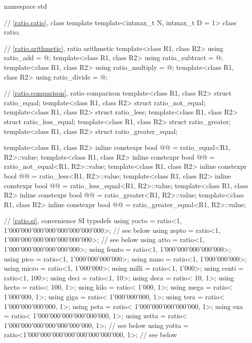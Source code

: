 %
\begin{codeblockdigitsep}
namespace std {
  // \ref{ratio.ratio}, class template 
  template<intmax_t N, intmax_t D = 1> class ratio;

  // \ref{ratio.arithmetic}, ratio arithmetic
  template<class R1, class R2> using ratio_add = @\seebelow@;
  template<class R1, class R2> using ratio_subtract = @\seebelow@;
  template<class R1, class R2> using ratio_multiply = @\seebelow@;
  template<class R1, class R2> using ratio_divide = @\seebelow@;

  // \ref{ratio.comparison}, ratio comparison
  template<class R1, class R2> struct ratio_equal;
  template<class R1, class R2> struct ratio_not_equal;
  template<class R1, class R2> struct ratio_less;
  template<class R1, class R2> struct ratio_less_equal;
  template<class R1, class R2> struct ratio_greater;
  template<class R1, class R2> struct ratio_greater_equal;

  template<class R1, class R2>
    inline constexpr bool @@ = ratio_equal<R1, R2>::value;
  template<class R1, class R2>
    inline constexpr bool @@ = ratio_not_equal<R1, R2>::value;
  template<class R1, class R2>
    inline constexpr bool @@ = ratio_less<R1, R2>::value;
  template<class R1, class R2>
    inline constexpr bool @@ = ratio_less_equal<R1, R2>::value;
  template<class R1, class R2>
    inline constexpr bool @@ = ratio_greater<R1, R2>::value;
  template<class R1, class R2>
    inline constexpr bool @@ = ratio_greater_equal<R1, R2>::value;

  // \ref{ratio.si}, convenience SI typedefs
  using yocto = ratio<1, 1'000'000'000'000'000'000'000'000>;  // see below
  using zepto = ratio<1,     1'000'000'000'000'000'000'000>;  // see below
  using atto  = ratio<1,         1'000'000'000'000'000'000>;
  using femto = ratio<1,             1'000'000'000'000'000>;
  using pico  = ratio<1,                 1'000'000'000'000>;
  using nano  = ratio<1,                     1'000'000'000>;
  using micro = ratio<1,                         1'000'000>;
  using milli = ratio<1,                             1'000>;
  using centi = ratio<1,                               100>;
  using deci  = ratio<1,                                10>;
  using deca  = ratio<                               10, 1>;
  using hecto = ratio<                              100, 1>;
  using kilo  = ratio<                            1'000, 1>;
  using mega  = ratio<                        1'000'000, 1>;
  using giga  = ratio<                    1'000'000'000, 1>;
  using tera  = ratio<                1'000'000'000'000, 1>;
  using peta  = ratio<            1'000'000'000'000'000, 1>;
  using exa   = ratio<        1'000'000'000'000'000'000, 1>;
  using zetta = ratio<    1'000'000'000'000'000'000'000, 1>;  // see below
  using yotta = ratio<1'000'000'000'000'000'000'000'000, 1>;  // see below
}
\end{codeblockdigitsep}

